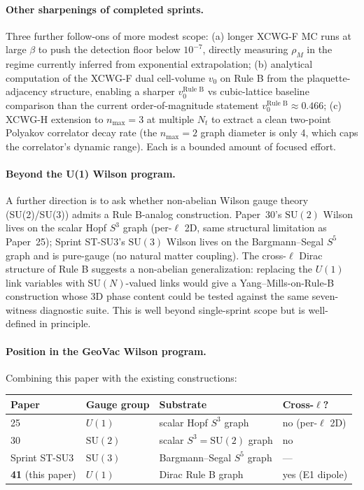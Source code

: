 \documentclass[11pt]{article}
\begin{document}
\paragraph{Other sharpenings of completed sprints.} Three further follow-ons
of more modest scope: (a) longer XCWG-F MC runs at large $\beta$ to push
the detection floor below $10^{-7}$, directly measuring $\rho_M$ in the
regime currently inferred from exponential extrapolation; (b) analytical
computation of the XCWG-F dual cell-volume $v_0$ on Rule B from the
plaquette-adjacency structure, enabling a sharper $v_0^\text{Rule B}$ vs
cubic-lattice baseline comparison than the current order-of-magnitude
statement $v_0^\text{Rule B}\approx 0.466$; (c) XCWG-H extension to
$n_\text{max}=3$ at multiple $N_t$ to extract a clean two-point Polyakov
correlator decay rate (the $n_\text{max}=2$ graph diameter is only 4,
which caps the correlator's dynamic range). Each is a bounded amount
of focused effort.

\paragraph{Beyond the U(1) Wilson program.} A further direction is to ask whether non-abelian Wilson
gauge theory (SU(2)/SU(3)) admits a Rule B-analog construction. Paper~30's
$\mathrm{SU}(2)$ Wilson lives on the scalar Hopf $S^3$ graph
(per-$\ell$ 2D, same structural limitation as Paper~25); Sprint ST-SU3's
$\mathrm{SU}(3)$ Wilson lives on the Bargmann--Segal $S^5$ graph and is
pure-gauge (no natural matter coupling). The cross-$\ell$ Dirac structure
of Rule B suggests a non-abelian generalization: replacing the $U(1)$ link
variables with $\mathrm{SU}(N)$-valued links would give a Yang--Mills-on-Rule-B
construction whose 3D phase content could be tested against the same
seven-witness diagnostic suite. This is well beyond
single-sprint scope but is well-defined in principle.

\paragraph{Position in the GeoVac Wilson program.} Combining this paper with
the existing constructions:

\begin{center}
\begin{tabular}{llll}
\toprule
Paper & Gauge group & Substrate & Cross-$\ell$? \\
\midrule
25~\cite{paper25} & $U(1)$ & scalar Hopf $S^3$ graph & no (per-$\ell$ 2D) \\
30~\cite{paper30} & $\mathrm{SU}(2)$ & scalar $S^3=\mathrm{SU}(2)$ graph & no \\
Sprint ST-SU3 & $\mathrm{SU}(3)$ & Bargmann--Segal $S^5$ graph & --- \\
\textbf{41} (this paper) & $U(1)$ & Dirac Rule B graph & yes (E1 dipole) \\
\bottomrule
\end{tabular}
\end{center}
\end{document}
